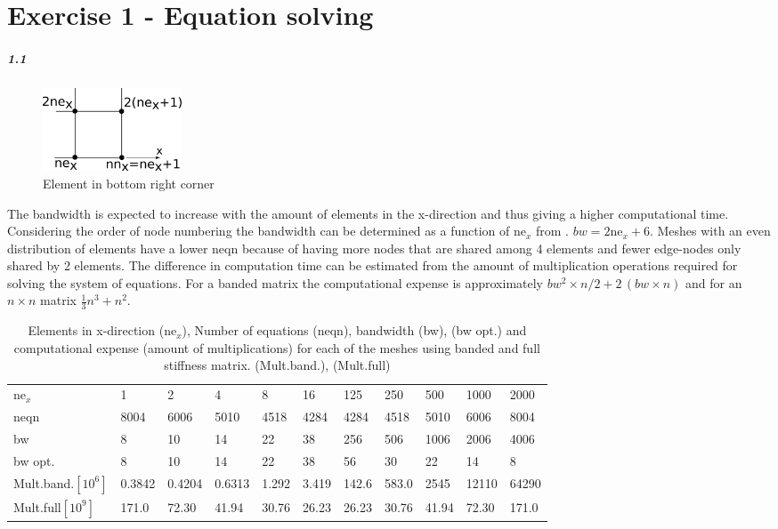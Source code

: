 \chapter{Exercise 1 - Equation solving}
\paragraph{1.1}
\begin{figure}
\flushright
    \centering
    \includegraphics[trim=.0cm .0cm .0cm .0cm, clip=true,width=0.20\textwidth]{Figures/BWfuncofnex.eps}
\caption{Element in bottom right corner}
\label{fig:meshcorner}
\end{figure}
The bandwidth is expected to increase with the amount of elements in the x-direction and thus giving a higher computational time. 
Considering the order of node numbering the bandwidth can be determined as a function of $\text{ne}_x$ from . $bw=2 \text{ne}_x+6$.
Meshes with an even distribution of elements have a lower neqn because of having more nodes that are shared among 4 elements and fewer edge-nodes only shared by 2 elements.
The difference in computation time can be estimated from the amount of multiplication operations required for solving the system of equations. For a banded matrix the computational expense is approximately $bw^2\times n/2 + 2\,(bw \times n)$ and for an $n \times n$ matrix $\frac{1}{3} n^3+n^2$.

\vspace{2mm}
\begin{table}[h!]
    \centering
    \caption{Elements in x-direction ($\text{ne}_x$), Number of equations (neqn), bandwidth (bw), (bw opt.) and computational expense (amount of multiplications) for each of the meshes using banded and full stiffness matrix. (Mult.band.), (Mult.full)}
    \begin{tabular}{@{}lllllllllll@{}}
    \toprule
    $\text{ne}_x$    & 1 & 2 & 4 & 8 & 16 & 125 & 250 & 500 & 1000 & 2000\\ 
    neqn               & 8004 & 6006 & 5010 & 4518 & 4284 & 4284 & 4518 & 5010 & 6006 & 8004 \\ 
    bw & 8 & 10 & 14 & 22 & 38 & 256 & 506 & 1006 & 2006 & 4006 \\ 
    bw opt. & 8 & 10 & 14 & 22 & 38 & 56 & 30 & 22 & 14 & 8\\
    Mult.band.$[10^6]$&\num{0.3842}&\num{0.4204}&\num{0.6313}&\num{1.292}&\num{3.419}&\num{142.6}&\num{583.0}&\num{2545}&\num{12110}&\num{64290} \\
    Mult.full$[10^9]$& \num{171.0} & \num{72.30} & \num{41.94} & \num{30.76} & \num{26.23} & \num{26.23} & \num{30.76} & \num{41.94} & \num{72.30} & \num{171.0} \\
    \bottomrule
    \end{tabular}
    \label{tab:equationsolv}
\end{table}
\vspace{-3mm}
